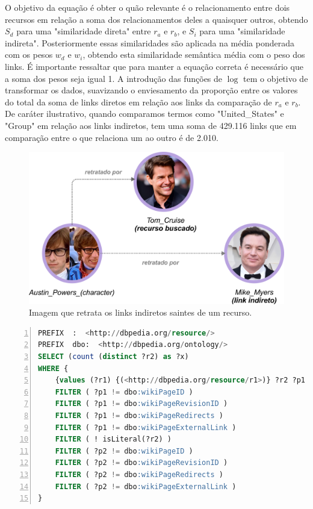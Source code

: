 O objetivo da equação é obter o quão relevante é o relacionamento entre dois recursos em relação a soma dos relacionamentos deles a quaisquer outros, obtendo $S_d$ para uma "similaridade direta" entre $r_a$ e $r_b$, e $S_i$ para uma "similaridade indireta". Posteriormente essas similaridades são aplicada na média ponderada com os pesos $w_d$ e $w_i$, obtendo esta similaridade semântica média com o peso dos links. É importante ressaltar que para manter a equação correta é necessário que a soma dos pesos seja igual 1. A introdução das funções de $\log$ tem o objetivo de transformar os dados, suavizando o enviesamento da proporção entre os valores do total da soma de links diretos em relação aos links da comparação de $r_a$ e $r_b$. De caráter ilustrativo, quando comparamos termos como "United\_States" e "Group" em relação aos links indiretos, tem uma soma de 429.116 links que em comparação entre o que relaciona um ao outro é de 2.010.

\begin{figure}
	\centering
	\includegraphics[scale=0.35]{imagens/ci_links.png}
	\caption{Imagem que retrata os links indiretos saintes de um recurso.}
	\label{fig:ci_links}
\end{figure}

\begin{lstlisting}[caption=Consulta SPARQL para contagem de links indiretos., language=SQL, frame=single, label={cod:sparql_ci}, float, numbers=left]
PREFIX  :  <http://dbpedia.org/resource/>
PREFIX  dbo:  <http://dbpedia.org/ontology/>
SELECT (count (distinct ?r2) as ?x)
WHERE {
	{values (?r1) {(<http://dbpedia.org/resource/r1>)} ?r2 ?p1 ?r1 . ?r2 ?p2 ?r3 . FILTER (?r1 != ?r3 && ?r2 != ?r1 && ?r2 != ?r3)}
	FILTER ( ?p1 != dbo:wikiPageID )
	FILTER ( ?p1 != dbo:wikiPageRevisionID )
	FILTER ( ?p1 != dbo:wikiPageRedirects )
	FILTER ( ?p1 != dbo:wikiPageExternalLink )
	FILTER ( ! isLiteral(?r2) )
	FILTER ( ?p2 != dbo:wikiPageID )
	FILTER ( ?p2 != dbo:wikiPageRevisionID )
	FILTER ( ?p2 != dbo:wikiPageRedirects )
	FILTER ( ?p2 != dbo:wikiPageExternalLink )
}
\end{lstlisting}

